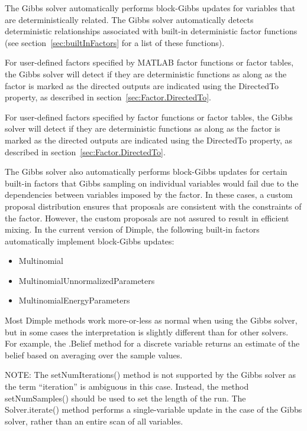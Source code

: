 The Gibbs solver automatically performs block-Gibbs updates for variables that are deterministically related.  The Gibbs solver automatically detects deterministic relationships associated with built-in deterministic factor functions (see section~\ref{sec:builtInFactors} for a list of these functions).  

\ifmatlab
For user-defined factors specified by MATLAB factor functions or factor tables, the Gibbs solver will detect if they are deterministic functions as along as the factor is marked as the directed outputs are indicated using the DirectedTo property, as described in section~\ref{sec:Factor.DirectedTo}.
\fi

\ifjava
For user-defined factors specified by factor functions or factor tables, the Gibbs solver will detect if they are deterministic functions as along as the factor is marked as the directed outputs are indicated using the DirectedTo property, as described in section~\ref{sec:Factor.DirectedTo}.
\fi
 
The Gibbs solver also automatically performs block-Gibbs updates for certain built-in factors that Gibbs sampling on individual variables would fail due to the dependencies between variables imposed by the factor.  In these cases, a custom proposal distribution ensures that proposals are consistent with the constraints of the factor.  However, the custom proposals are not assured to result in efficient mixing.  In the current version of Dimple, the following built-in factors automatically implement block-Gibbs updates:
%
\begin{itemize}
\item Multinomial
\item MultinomialUnnormalizedParameters
\item MultinomialEnergyParameters
\end{itemize}


Most Dimple methods work more-or-less as normal when using the Gibbs solver, but in some cases the interpretation is slightly different than for other solvers. For example, the .Belief method for a discrete variable returns an estimate of the belief based on averaging over the sample values.

NOTE: The setNumIterations() method is not supported by the Gibbs solver as the term ``iteration'' is ambiguous in this case. Instead, the method setNumSamples() should be used to set the length of the run. The Solver.iterate() method performs a single-variable update in the case of the Gibbs solver, rather than an entire scan of all variables.

